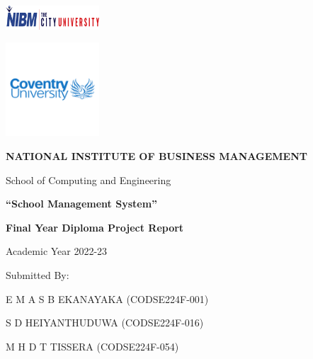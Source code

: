 \documentclass[12pt,a4paper]{report}
\begin{document}
\begin{titlepage}
    \centering
    \vspace*{0.3cm}
    
    \includegraphics[width=3.5cm]{nibm-logo.png} %
    
    \vspace{1cm}
    
    \includegraphics[width=3.5cm]{coventry-logo.png} %
    
    \vspace{1cm}
    
    {\Huge\bfseries NATIONAL INSTITUTE OF BUSINESS MANAGEMENT}
    
    \vspace{1cm}
    
    {\Large School of Computing and Engineering}
    
    \vspace{1.2cm}
    
    {\Huge\bfseries ``School Management System''}
    
    \vspace{1.2cm}
    
    {\Large\bfseries Final Year Diploma Project Report}
    
    {\large Academic Year 2022-23}
    
    \vspace{1.5cm}
    
    {\Large Submitted By:}
    
    \vspace{0.5cm}
    
    {\large E M A S B EKANAYAKA (CODSE224F-001)}
    
    {\large S D HEIYANTHUDUWA (CODSE224F-016)}
    
    {\large M H D T TISSERA (CODSE224F-054)}
    
    \vspace{1cm}
    

\end{titlepage}
\end{document}
